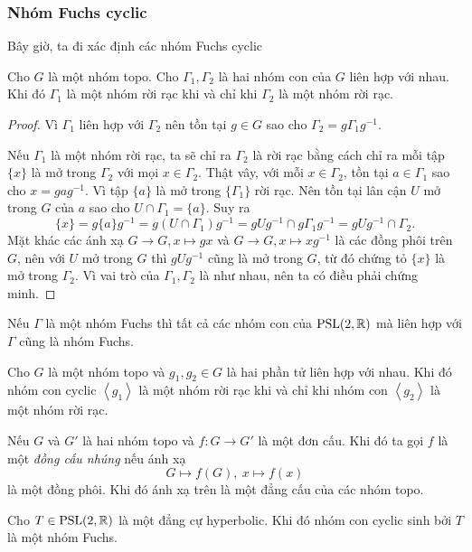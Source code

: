 \subsubsection{Nhóm Fuchs cyclic}
Bây giờ, ta đi xác định các nhóm Fuchs cyclic
\begin{lem}\label{lem 3.2.6}
    Cho $G$ là một nhóm topo. Cho $\Gamma_1, \Gamma_2$ là hai nhóm con của $G$ liên hợp với nhau. Khi đó $\Gamma_1$ là một nhóm rời rạc khi và chỉ khi $\Gamma_2$ là một nhóm rời rạc.
\end{lem}
\begin{proof}
    Vì $\Gamma_1$ liên hợp với $\Gamma_2$ nên tồn tại $g\in G$ sao cho $\Gamma_2 = g\Gamma_1 g^{-1}$. 
    
    Nếu $\Gamma_1$ là một nhóm rời rạc, ta sẽ chỉ ra $\Gamma_2$ là rời rạc bằng cách chỉ ra mỗi tập $\{x\}$ là mở trong $\Gamma_2$ với mọi $x\in \Gamma_2$. Thật vây, với mỗi $x\in \Gamma_2$, tồn tại $a \in \Gamma_1$ sao cho $x=gag^{-1}$. Vì tập $\{a\}$ là mở trong $\{\Gamma_1\}$ rời rạc. Nên tồn tại lân cận $U$ mở trong $G$ của $a$ sao cho $U \cap \Gamma_1 = \{a\}$. Suy ra 
    \[\{x\} = g\{a\}g^{-1} = g(U \cap \Gamma_1)g^{-1} = gUg^{-1} \cap g\Gamma_1 g^{-1} = gUg^{-1} \cap \Gamma_2.\]
    Mặt khác các ánh xạ $G \to G, x\mapsto gx$ và $G \to G, x\mapsto xg^{-1}$ là các đồng phôi trên $G$, nên với $U$ mở trong $G$ thì $gUg^{-1}$ cũng là mở trong $G$, từ đó chứng tỏ $\{x\}$ là mở trong $\Gamma_2$. 
    Vì vai trò của $\Gamma_1, \Gamma_2$ là như nhau, nên ta có điều phải chứng minh.
\end{proof}
\begin{cor}
    Nếu $\Gamma$ là một nhóm Fuchs thì tất cả các nhóm con của $\operatorname{PSL}(2,\mathbb{R})$ mà liên hợp với $\Gamma$ cũng là nhóm Fuchs.
\end{cor}
\begin{cor}
    Cho $G$ là một nhóm topo và $g_1,g_2 \in G$ là hai phần tử liên hợp với nhau. Khi đó nhóm con cyclic $\left<g_1\right>$ là một nhóm rời rạc khi và chỉ khi nhóm con $\left<g_2\right>$ là một nhóm rời rạc.
\end{cor}
Nếu $G$ và $G'$ là hai nhóm topo và $f: G \to G'$ là một đơn cấu. Khi đó ta gọi $f$ là một \textit{đồng cấu nhúng} nếu ánh xạ
\[G \mapsto f(G),~x\mapsto f(x)\]
là một đồng phôi. Khi đó ánh xạ trên là một đẳng cấu của các nhóm topo.
\begin{prop}\label{prop 3.2.9}
    Cho $T \in \operatorname{PSL}(2,\mathbb{R})$ là một đẳng cự hyperbolic. Khi đó nhóm con cyclic sinh bởi $T$ là một nhóm Fuchs.
\end{prop}

